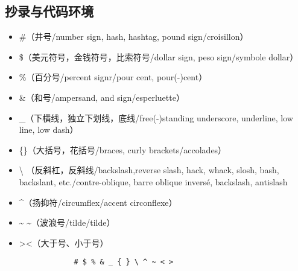 \documentclass{ctexart}
\begin{document}
    \subsection{抄录与代码环境}
            \begin{itemize}
                \item \#（井号/number sign, hash, hashtag, pound sign/croisillon）
                \item \$（美元符号，金钱符号，比索符号/dollar sign, peso sign/symbole dollar）
                \item \%（百分号/percent signr/pour cent, pour(-)cent）
                \item \&（和号/ampersand, and sign/esperluette）
                \item \_（下横线，独立下划线，底线/free(-)standing underscore, underline, low line, low dash）
                \item \{\}（大括号，花括号/braces, curly brackets/accolades）
                \item \textbackslash \textrm{} {\rmfamily {}}（反斜杠，反斜线/backslash,reverse slash, hack, whack, slosh, bash, backslant, etc./contre-oblique, barre oblique inversé, backslash, antislash
                \item \^{}（扬抑符/circumflex/accent circonflexe）
                \item \~{} \textasciitilde（波浪号/tilde/tilde）
                \item \textgreater \textless（大于号、小于号）
            \end{itemize}
        

            \begin{verbatim}
                # $ % & _ { } \ ^ ~ < >
            \end{verbatim}
        
\end{document}
